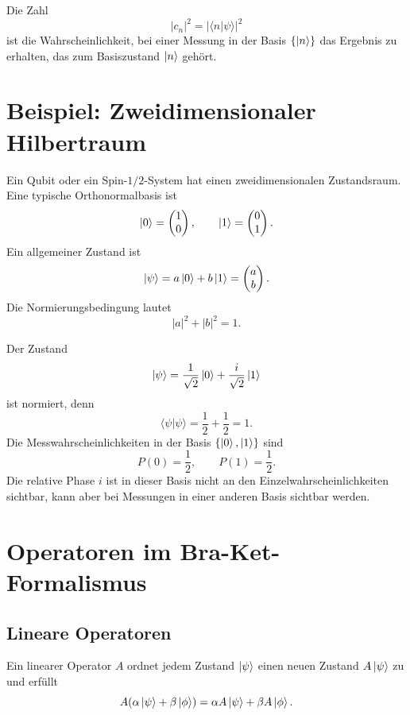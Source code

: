 \begin{conceptbox}
Die Zahl
\[
    |c_n|^2=|\langle n|\psi\rangle|^2
\]
ist die Wahrscheinlichkeit, bei einer Messung in der Basis $\{\left|n\right\rangle\}$ das Ergebnis zu erhalten, das zum Basiszustand $\left|n\right\rangle$ gehört.
\end{conceptbox}

\section{Beispiel: Zweidimensionaler Hilbertraum}

Ein Qubit oder ein Spin-$1/2$-System hat einen zweidimensionalen Zustandsraum. Eine typische Orthonormalbasis ist
\[
    \left|0\right\rangle=\begin{pmatrix}1\\0\end{pmatrix},
    \qquad
    \left|1\right\rangle=\begin{pmatrix}0\\1\end{pmatrix}.
\]
Ein allgemeiner Zustand ist
\[
    \left|\psi\right\rangle=a\left|0\right\rangle+b\left|1\right\rangle
    =\begin{pmatrix}a\\b\end{pmatrix}.
\]
Die Normierungsbedingung lautet
\[
    |a|^2+|b|^2=1.
\]

\begin{examplebox}
Der Zustand
\[
    \left|\psi\right\rangle=\frac{1}{\sqrt2}\left|0\right\rangle+\frac{i}{\sqrt2}\left|1\right\rangle
\]
ist normiert, denn
\[
    \langle\psi|\psi\rangle
    =\frac12+\frac12=1.
\]
Die Messwahrscheinlichkeiten in der Basis $\{\left|0\right\rangle,\left|1\right\rangle\}$ sind
\[
    P(0)=\frac12,
    \qquad
    P(1)=\frac12.
\]
Die relative Phase $i$ ist in dieser Basis nicht an den Einzelwahrscheinlichkeiten sichtbar, kann aber bei Messungen in einer anderen Basis sichtbar werden.
\end{examplebox}

\section{Operatoren im Bra-Ket-Formalismus}

\subsection{Lineare Operatoren}

\begin{definitionbox}
Ein linearer Operator $A$ ordnet jedem Zustand $\left|\psi\right\rangle$ einen neuen Zustand $A\left|\psi\right\rangle$ zu und erfüllt
\[
    A(\alpha\left|\psi\right\rangle+\beta\left|\phi\right\rangle)
    =\alpha A\left|\psi\right\rangle+\beta A\left|\phi\right\rangle.
\]
\end{definitionbox}

